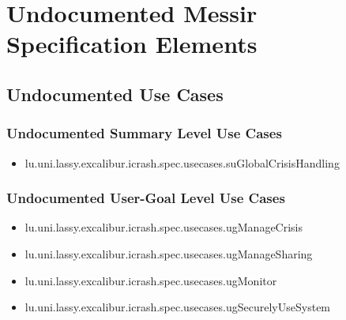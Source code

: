 	
\chapter{Undocumented Messir Specification Elements}


\section[Undocumented Use Cases]{Undocumented Use Cases}

\subsection[Undocumented Use Cases - Summary Level]{Undocumented Summary Level Use Cases}
\begin{itemize}
\item lu.uni.lassy.excalibur.icrash.spec.usecases.suGlobalCrisisHandling 
\end{itemize}

\subsection[Undocumented Use Cases - User-Goal Level]{Undocumented User-Goal Level Use Cases}
\begin{itemize}
\item lu.uni.lassy.excalibur.icrash.spec.usecases.ugManageCrisis 
\item lu.uni.lassy.excalibur.icrash.spec.usecases.ugManageSharing 
\item lu.uni.lassy.excalibur.icrash.spec.usecases.ugMonitor 
\item lu.uni.lassy.excalibur.icrash.spec.usecases.ugSecurelyUseSystem 
\end{itemize}

